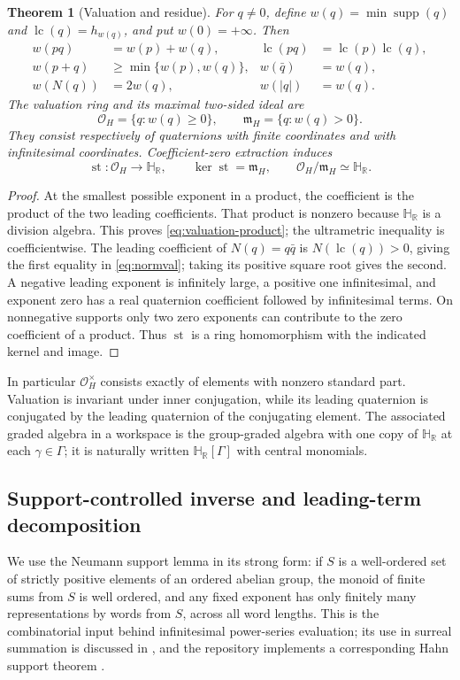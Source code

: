 \documentclass[11pt,letterpaper]{article}
\numberwithin{equation}{section}
\newtheorem{theorem}{Theorem}[section]
\theoremstyle{definition}
\theoremstyle{remark}
\newcommand{\HR}{\mathbb H_{\mathbb R}}
\newcommand{\OO}{\mathcal O}
\newcommand{\mm}{\mathfrak m}
\newcommand{\st}{\operatorname{st}}
\newcommand{\supp}{\operatorname{supp}}
\newcommand{\lc}{\operatorname{lc}}
\begin{document}
\begin{theorem}[Valuation and residue]\label{thm:valuation}
For $q\ne0$, define $w(q)=\min\supp(q)$ and $\lc(q)=h_{w(q)}$, and put $w(0)=+\infty$.
Then
\begin{align}
 w(pq)&=w(p)+w(q),&\lc(pq)&=\lc(p)\lc(q),\label{eq:valuation-product}\\
 w(p+q)&\ge\min\{w(p),w(q)\},&w(\bar q)&=w(q),\\
 w(N(q))&=2w(q),&w(|q|)&=w(q).\label{eq:normval}
\end{align}
The valuation ring and its maximal two-sided ideal are
\[
 \OO_H=\{q:w(q)\ge0\},\qquad \mm_H=\{q:w(q)>0\}.
\]
They consist respectively of quaternions with finite coordinates and with infinitesimal
coordinates. Coefficient-zero extraction induces
\begin{equation}\label{eq:residue}
 \st:\OO_H\longrightarrow\HR,\qquad
 \ker\st=\mm_H,\qquad \OO_H/\mm_H\simeq\HR.
\end{equation}
\end{theorem}
\begin{proof}
At the smallest possible exponent in a product, the coefficient is the product of the two
leading coefficients. That product is nonzero because $\HR$ is a division algebra. This
proves \eqref{eq:valuation-product}; the ultrametric inequality is coefficientwise.
The leading coefficient of $N(q)=q\bar q$ is $N(\lc(q))>0$, giving the first equality in
\eqref{eq:normval}; taking its positive square root gives the second.
A negative leading exponent is infinitely large, a positive one infinitesimal, and exponent
zero has a real quaternion coefficient followed by infinitesimal terms. On nonnegative
supports only two zero exponents can contribute to the zero coefficient of a product.
Thus $\st$ is a ring homomorphism with the indicated kernel and image.
\end{proof}

In particular $\OO_H^\times$ consists exactly of elements with nonzero standard part.
Valuation is invariant under inner conjugation, while its leading quaternion is conjugated
by the leading quaternion of the conjugating element. The associated graded algebra in a
workspace is the group-graded algebra with one copy of $\HR$ at each $\gamma\in\Gamma$;
it is naturally written $\HR[\Gamma]$ with central monomials.

\subsection{Support-controlled inverse and leading-term decomposition}
We use the Neumann support lemma in its strong form: if $S$ is a well-ordered set of strictly
positive elements of an ordered abelian group, the monoid of finite sums from $S$ is well
ordered, and any fixed exponent has only finitely many representations by words from $S$,
across all word lengths. This is the combinatorial input behind infinitesimal power-series
evaluation; its use in surreal summation is discussed in \cite{BM}, and the repository
implements a corresponding Hahn support theorem \cite{Repo}.
\end{document}
